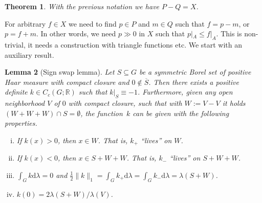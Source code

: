 \documentclass[[a4paper,english,12pt]{amsart}
\theoremstyle{plain}
\newtheorem{theorem}{Theorem}[section]
\newtheorem{lemma}[theorem]{Lemma}
\theoremstyle{remark}
\newcommand{\RR}{\mathbb R}
\def\dd{\mathrm{d}}
\def\haar{\lambda}
\begin{document}
\begin{theorem}\label{t:Ppluslemma} With the previous notation we  have $P-Q=X$.
\end{theorem}
 For arbitrary $f\in X$ we need to  find $p \in P$ and $m \in Q$  such that $f=p-m$, or $p=f+m$. In other words, we need $p\gg 0$ in $X$ such that $p|_A \le f|_A$.
This is non-trivial, it needs a construction with triangle functions etc. We start with an auxiliary result.


\begin{lemma}[Sign swap lemma]\label{l:signswap}
	 Let $S \subseteq  G$ be a symmetric Borel set of positive Haar measure  with compact closure and $0 \not\in \overline{S}$.
Then there exists a positive definite $k \in C_c(G;\RR)$ such that $k|_S \equiv -1$.
Furthermore, given any open neighborhood $V$ of $0$ with compact closure, such that with $W:=V-V$ it holds $(W+W+W) \cap S = \emptyset$, the function~$k$ can be given with the following properties.
\begin{enumerate}[(i)]
  \item If $k(x)>0$, then $x \in W$. That is, $k_{+}$ ``lives'' on $W$.
  \item If $k(x)<0$, then $x \in S+W+W$. That is, $k_{-}$ ``lives'' on $S+W+W$.
  \item $\int_G k\dd\haar =0$ and $\frac12 \| k\|_1 = \int_G k_{+}\dd\haar = \int_G k_{-}\dd\haar = \lambda(S+W)$.
  \item $k(0)=2 \lambda(S+W)/\lambda(V)$.
  \end{enumerate}
\end{lemma}
\end{document}
